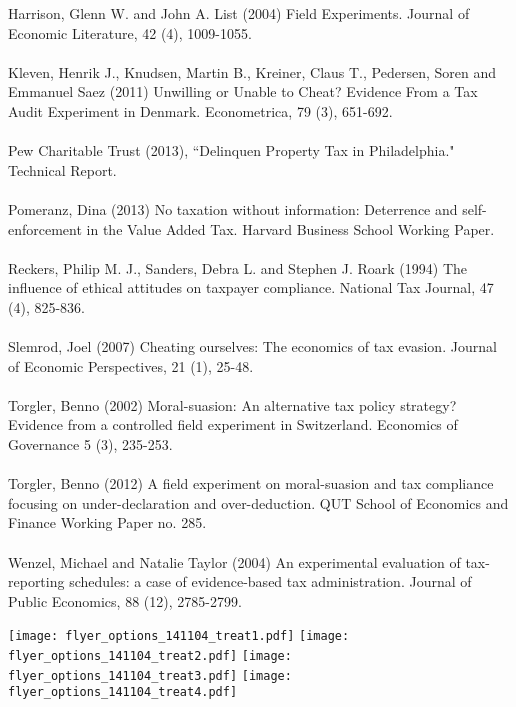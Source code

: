 \documentclass[12pt,titlepage]{article}
\begin{document}
Harrison, Glenn W. and John A. List (2004) Field Experiments. Journal of Economic Literature, 42 (4),
1009-1055. \\
\\
Kleven, Henrik J., Knudsen, Martin B., Kreiner, Claus T., Pedersen, Soren and Emmanuel Saez (2011)
Unwilling or Unable to Cheat? Evidence From a Tax Audit Experiment in Denmark.
Econometrica, 79 (3), 651-692. \\
\\
Pew Charitable Trust (2013), ``Delinquen Property Tax in Philadelphia." Technical Report. \\
\\
Pomeranz, Dina (2013) No taxation without information: Deterrence and self-enforcement in the Value
Added Tax. Harvard Business School Working Paper. \\
\\
Reckers, Philip M. J., Sanders, Debra L. and Stephen J. Roark (1994) The influence of ethical attitudes on
taxpayer compliance. National Tax Journal, 47 (4), 825-836. \\
\\
Slemrod, Joel (2007) Cheating ourselves: The economics of tax evasion. Journal of Economic
Perspectives, 21 (1), 25-48. \\
\\
Torgler, Benno (2002) Moral-suasion: An alternative tax policy strategy? Evidence from a controlled field
experiment in Switzerland. Economics of Governance 5 (3), 235-253. \\
\\
Torgler, Benno (2012) A field experiment on moral-suasion and tax compliance focusing on under-declaration
and over-deduction. QUT School of Economics and Finance Working Paper no. 285. \\
\\
Wenzel, Michael and Natalie Taylor (2004) An experimental evaluation of tax-reporting schedules: a case of
evidence-based tax administration. Journal of Public Economics, 88 (12), 2785-2799.

\newpage

\texttt{[image: flyer\_options\_141104\_treat1.pdf]}
\newpage
\texttt{[image: flyer\_options\_141104\_treat2.pdf]}
\newpage
\texttt{[image: flyer\_options\_141104\_treat3.pdf]}
\newpage
\texttt{[image: flyer\_options\_141104\_treat4.pdf]}
\end{document}
